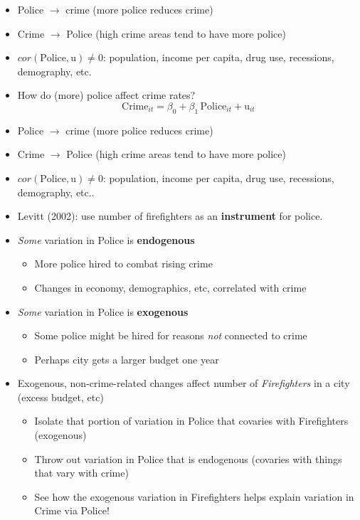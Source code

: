 \documentclass[
]{article}
\providecommand{\tightlist}{%
  \setlength{\itemsep}{0pt}\setlength{\parskip}{0pt}}
\begin{document}
\begin{itemize}
\item
  Police \(\rightarrow\) crime (more police reduces crime)
\item
  Crime \(\rightarrow\) Police (high crime areas tend to have more
  police)
\item
  \(cor(\text{Police}, \text{u})\neq 0\): population, income per capita,
  drug use, recessions, demography, etc.
\item
  How do (more) police affect crime rates?
  \[\text{Crime}_{it}=\beta_0+\beta_1 \, \text{Police}_{it}+\text{u}_{it}\]
\item
  Police \(\rightarrow\) crime (more police reduces crime)
\item
  Crime \(\rightarrow\) Police (high crime areas tend to have more
  police)
\item
  \(cor(\text{Police}, \text{u})\neq 0\): population, income per capita,
  drug use, recessions, demography, etc..
\item
  Levitt (2002): use number of firefighters as an \textbf{instrument}
  for police.
\item
  \emph{Some} variation in Police is \textbf{endogenous}

  \begin{itemize}
  \tightlist
  \item
    More police hired to combat rising crime
  \item
    Changes in economy, demographics, etc, correlated with crime
  \end{itemize}
\item
  \emph{Some} variation in Police is \textbf{exogenous}

  \begin{itemize}
  \tightlist
  \item
    Some police might be hired for reasons \emph{not} connected to crime
  \item
    Perhaps city gets a larger budget one year
  \end{itemize}
\item
  Exogenous, non-crime-related changes affect number of
  \emph{Firefighters} in a city (excess budget, etc)

  \begin{itemize}
  \tightlist
  \item
    Isolate that portion of variation in Police that covaries with
    Firefighters (exogenous)
  \item
    Throw out variation in Police that is endogenous (covaries with
    things that vary with crime)
  \item
    See how the exogenous variation in Firefighters helps explain
    variation in Crime via Police!
  \end{itemize}
\end{itemize}
\end{document}
